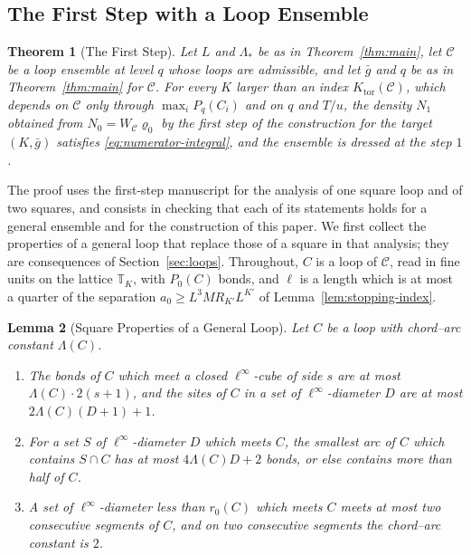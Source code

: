\documentclass[11pt]{preprint}
\numberwithin{equation}{section}
\newtheorem{theorem}{Theorem}[section]
\newtheorem{lemma}[theorem]{Lemma}
\theoremstyle{definition}
\theoremstyle{remark}
\theoremstyle{plain}
\begin{document}
\subsection{The First Step with a Loop Ensemble}\label{sec:first-step-proof}

\begin{theorem}[The First Step]\label{thm:first-step}
Let $L$ and $\Lambda_*$ be as in Theorem~\ref{thm:main}, let $\mathcal C$ be a loop ensemble at level $q$ whose loops are admissible, and let $\bar g$ and $q$ be as in Theorem~\ref{thm:main} for $\mathcal C$. For every $K$ larger than an index $K_{\mathrm{tor}}(\mathcal C)$, which depends on $\mathcal C$ only through $\max_iP_q(C_i)$ and on $q$ and $T/u$, the density $N_1$ obtained from $N_0 = W_{\mathcal C}\varrho_0$ by the first step of the construction for the target $(K, \bar g)$ satisfies \eqref{eq:numerator-integral}, and the ensemble is dressed at the step $1$.
\end{theorem}

The proof uses the first-step manuscript \cite{WilsonFirstStep} for the analysis of one square loop and of two squares, and consists in checking that each of its statements holds for a general ensemble and for the construction of this paper. We first collect the properties of a general loop that replace those of a square in that analysis; they are consequences of Section~\ref{sec:loops}. Throughout, $C$ is a loop of $\mathcal C$, read in fine units on the lattice $\mathbb T_K$, with $P_0(C)$ bonds, and $\ell$ is a length which is at most a quarter of the separation $a_0 \geq L^3MR_{K'}L^{K'}$ of Lemma~\ref{lem:stopping-index}.

\begin{lemma}[Square Properties of a General Loop]\label{lem:square-properties}
Let $C$ be a loop with chord--arc constant $\Lambda(C)$.
\begin{enumerate}[label=(\roman*)]
\item The bonds of $C$ which meet a closed $\ell^\infty$-cube of side $s$ are at most $\Lambda(C)\cdot 2(s + 1)$, and the sites of $C$ in a set of $\ell^\infty$-diameter $D$ are at most $2\Lambda(C)(D + 1) + 1$.
\item For a set $S$ of $\ell^\infty$-diameter $D$ which meets $C$, the smallest arc of $C$ which contains $S \cap C$ has at most $4\Lambda(C)D + 2$ bonds, or else contains more than half of $C$.
\item A set of $\ell^\infty$-diameter less than $r_0(C)$ which meets $C$ meets at most two consecutive segments of $C$, and on two consecutive segments the chord--arc constant is $2$.
\end{enumerate}
\end{lemma}
\end{document}
